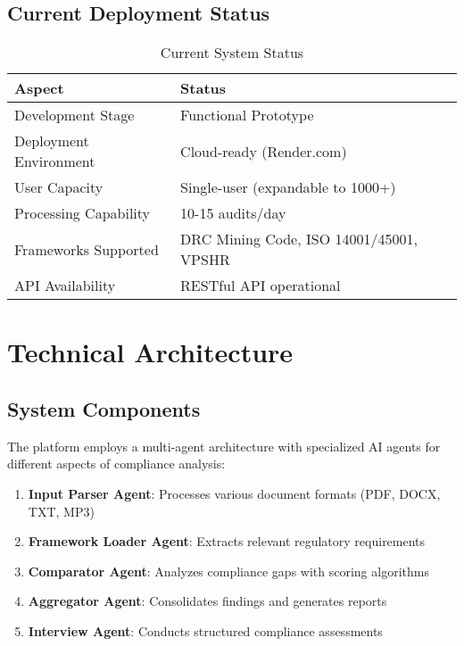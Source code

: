 \documentclass[11pt,a4paper]{article}
\begin{document}
\subsection{Current Deployment Status}

\begin{table}[H]
\centering
\begin{tabular}{ll}
\toprule
\textbf{Aspect} & \textbf{Status} \\
\midrule
Development Stage & Functional Prototype \\
Deployment Environment & Cloud-ready (Render.com) \\
User Capacity & Single-user (expandable to 1000+) \\
Processing Capability & 10-15 audits/day \\
Frameworks Supported & DRC Mining Code, ISO 14001/45001, VPSHR \\
API Availability & RESTful API operational \\
\bottomrule
\end{tabular}
\caption{Current System Status}
\end{table}

\section{Technical Architecture}

\subsection{System Components}

The platform employs a multi-agent architecture with specialized AI agents for different aspects of compliance analysis:

\begin{techspec}
\begin{enumerate}
    \item \textbf{Input Parser Agent}: Processes various document formats (PDF, DOCX, TXT, MP3)
    \item \textbf{Framework Loader Agent}: Extracts relevant regulatory requirements
    \item \textbf{Comparator Agent}: Analyzes compliance gaps with scoring algorithms
    \item \textbf{Aggregator Agent}: Consolidates findings and generates reports
    \item \textbf{Interview Agent}: Conducts structured compliance assessments
\end{enumerate}
\end{techspec}
\end{document}
